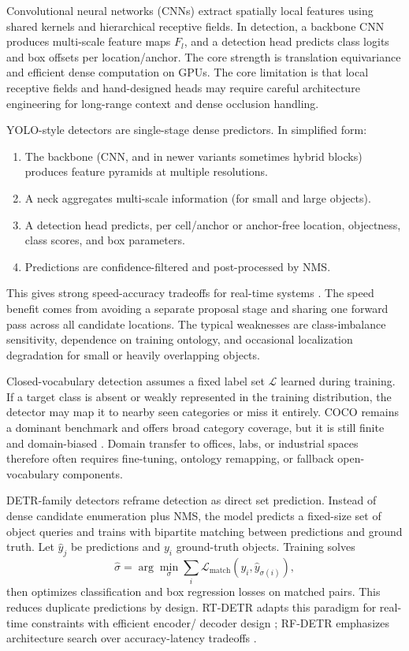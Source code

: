     Convolutional neural networks (CNNs) extract spatially local features using shared kernels and hierarchical receptive fields. In detection, a backbone CNN produces multi-scale feature maps \(F_l\), and
  a detection head predicts class logits and box offsets per location/anchor. The core strength is translation equivariance and efficient dense computation on GPUs. The core limitation is that local
  receptive fields and hand-designed heads may require careful architecture engineering for long-range context and dense occlusion handling.

    YOLO-style detectors are single-stage dense predictors. In simplified form:
  \begin{enumerate}
  \item The backbone (CNN, and in newer variants sometimes hybrid blocks) produces feature pyramids at multiple resolutions.
  \item A neck aggregates multi-scale information (for small and large objects).
  \item A detection head predicts, per cell/anchor or anchor-free location, objectness, class scores, and box parameters.
  \item Predictions are confidence-filtered and post-processed by NMS.
  \end{enumerate}
  This gives strong speed-accuracy tradeoffs for real-time systems \cite{sapkota_ultralytics_2026}. The speed benefit comes from avoiding a separate proposal stage and sharing one forward pass across all
  candidate locations. The typical weaknesses are class-imbalance sensitivity, dependence on training ontology, and occasional localization degradation for small or heavily overlapping objects.

    Closed-vocabulary detection assumes a fixed label set \(\mathcal{L}\) learned during training. If a target class is absent or weakly represented in the training distribution, the detector may map it to
  nearby seen categories or miss it entirely. COCO remains a dominant benchmark and offers broad category coverage, but it is still finite and domain-biased \cite{lin2015microsoftcococommonobjects}.
  Domain transfer to offices, labs, or industrial spaces therefore often requires fine-tuning, ontology remapping, or fallback open-vocabulary components.

    DETR-family detectors reframe detection as direct set prediction. Instead of dense candidate enumeration plus NMS, the model predicts a fixed-size set of object queries and trains with bipartite
  matching between predictions and ground truth. Let \(\hat{y}_j\) be predictions and \(y_i\) ground-truth objects. Training solves
  \[
  \hat{\sigma}=\arg\min_{\sigma}\sum_i \mathcal{L}_{\text{match}}(y_i,\hat{y}_{\sigma(i)}),
  \]
  then optimizes classification and box regression losses on matched pairs. This reduces duplicate predictions by design. RT-DETR adapts this paradigm for real-time constraints with efficient encoder/
  decoder design \cite{zhao_detrs_2024}; RF-DETR emphasizes architecture search over accuracy-latency tradeoffs \cite{robinson_rf-detr_2026}.

